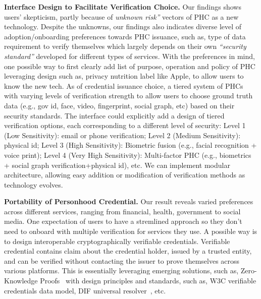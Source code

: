 \textbf{Interface Design to Facilitate Verification Choice.}
Our findings shows users' skepticism, partly because of \textit{unknown risk''} vectors of PHC as a new technology. Despite the unknowns, our findings also indicates diverse level of adoption/onboarding preferences towards PHC issuance, such as, type of data requirement to verify themselves which largely depends on their own \textit{``security standard''} developed for different types of services. With the preferences in mind, one possible way to first clearly add list of purpose, operation and policy of PHC leveraging design such as, privacy nutrition label\cite{kelley2009nutrition, li2022understanding} like Apple, to allow users to know the new tech.
As of credential issuance choice, a tiered system of PHCs with varying levels of verification strength
to allow users to choose ground truth data (e.g., gov id, face, video, fingerprint, social graph, etc) based on their security standards. The interface could explicitly add a design of tiered verification options, each corresponding to a different level of security: Level 1 (Low Sensitivity): email or phone verification; Level 2 (Medium Sensitivity): physical id;  Level 3 (High Sensitivity): Biometric fusion (e.g., facial recognition + voice print);  Level 4 (Very High Sensitivity): Multi-factor PHC (e.g., biometrics + social graph verification+physical id), etc. We can implement modular architecture, allowing easy addition or modification of verification methods as technology evolves. 

\textbf{Portability of Personhood Credential.} Our result reveals varied preferences across different services, ranging from financial, health, government to social media. One expectation of users to have a stremlined approach so they don't need to onboard with multiple verification for services they use. A possible way is to design interoperable cryptographically verifiable credentials. Verifiable credential contains claim about the credential holder, issued by a trusted entity, and can be verified without contacting the issuer to prove themselves across various platforms. This is essentially leveraging emerging solutions, such as, Zero-Knowledge Proofs~\cite{tobin2016inevitable} with design principles and standards, such as, W3C verifiable credentials data model, DIF universal resolver~\cite{mazzocca2024survey}, etc. 

